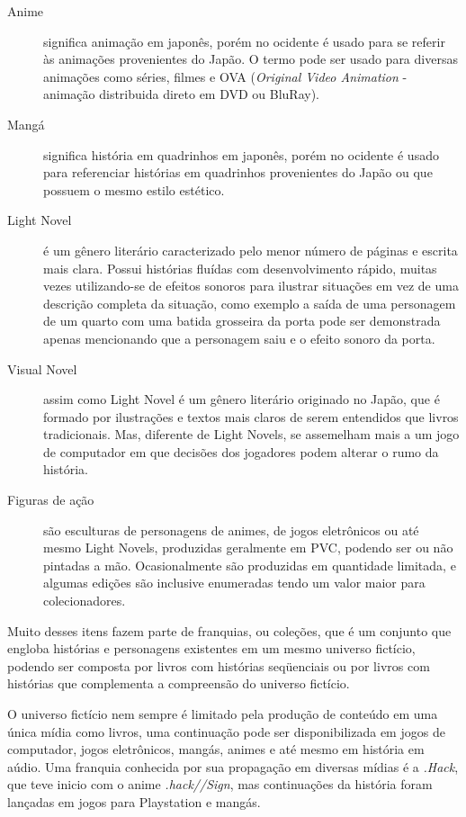 \documentclass[12pt]{article}
\begin{document}
\begin{description}
\item[Anime] significa animação em japonês, porém no ocidente é usado para se referir às animações provenientes do Japão. O termo pode ser usado para diversas animações como séries, filmes e OVA (\textit{Original Video Animation} - animação distribuida direto em DVD ou BluRay).
\item[Mangá] significa história em quadrinhos em japonês, porém no ocidente é usado para referenciar histórias em quadrinhos provenientes do Japão ou que possuem o mesmo estilo estético.
\item[Light Novel] é um gênero literário caracterizado pelo menor número de páginas e escrita mais clara. Possui histórias fluídas com desenvolvimento rápido, muitas vezes utilizando-se de efeitos sonoros para ilustrar situações em vez de uma descrição completa da situação, como exemplo a saída de uma personagem de um quarto com uma batida grosseira da porta pode ser demonstrada apenas mencionando que a personagem saiu e o efeito sonoro da porta.
\item[Visual Novel] assim como Light Novel é um gênero literário originado no Japão, que é formado por ilustrações e textos mais claros de serem entendidos que livros tradicionais. Mas, diferente de Light Novels, se assemelham mais a um jogo de computador em que decisões dos jogadores podem alterar o rumo da história.
\item[Figuras de ação] são esculturas de personagens de animes, de jogos eletrônicos ou até mesmo Light Novels, produzidas geralmente em PVC, podendo ser ou não pintadas a mão. Ocasionalmente são produzidas em quantidade limitada, e algumas edições são inclusive enumeradas tendo um valor maior para colecionadores.
\end{description}


Muito desses itens fazem parte de franquias, ou coleções, que é um conjunto que engloba histórias e personagens existentes em um mesmo universo fictício, podendo ser composta por livros com histórias seqüenciais ou por livros com histórias que complementa a compreensão do universo fictício. 

O universo fictício nem sempre é limitado pela produção de conteúdo em uma única mídia como livros, uma continuação pode ser disponibilizada em jogos de computador, jogos eletrônicos, mangás, animes e até mesmo em história em aúdio. Uma franquia conhecida por sua propagação em diversas mídias é a \emph{.Hack}, que teve inicio com o anime \emph{.hack//Sign}, mas continuações da história foram lançadas em jogos para Playstation e mangás. 
\end{document}
